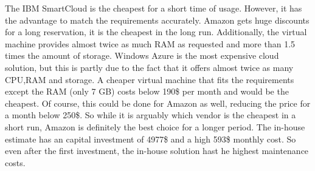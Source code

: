\documentclass[paper=a4, fontsize=11pt]{scrartcl} %
\numberwithin{equation}{section} %
\numberwithin{figure}{section} %
\numberwithin{table}{section} %
\begin{document}
The IBM SmartCloud is the cheapest for a short time of usage. However, it has the advantage to match the requirements accurately. Amazon gets huge discounts for a long reservation, it is the cheapest in the long run. Additionally, the virtual machine provides almost twice as much RAM as requested and more than 1.5 times the amount of storage. Windows Azure is the most expensive cloud solution, but this is partly due to the fact that it offers almost twice as many CPU,RAM and storage. A cheaper virtual machine that fits the requirements except the RAM (only 7 GB) costs below 190\$ per month and would be the cheapest. Of course, this could be done for Amazon as well, reducing the price for a month below 250\$. So while it is arguably which vendor is the cheapest in a short run, Amazon is definitely the best choice for a longer period. The in-house estimate has an capital investment of 4977\$ and a high 593\$ monthly cost. So even after the first investment, the in-house solution hast he highest maintenance costs.
\end{document}
